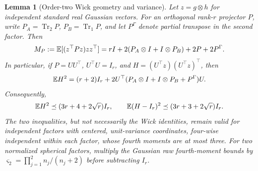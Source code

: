 \documentclass[11pt,a4paper]{article}
\newtheorem{lemma}[theorem]{Lemma}
\theoremstyle{definition}\newtheorem{definition}[theorem]{Definition}
\theoremstyle{remark}\newtheorem{remark}[theorem]{Remark}
\numberwithin{equation}{section}
\begin{document}
\begin{lemma}[Order-two Wick geometry and variance]
\label{core:lem:order-two-wick}
Let $z=g\otimes h$ for independent standard real Gaussian vectors.
For an orthogonal rank-$r$ projector $P$, write
$P_A=\operatorname{Tr}_2P$, $P_B=\operatorname{Tr}_1P$, and let
$P^\Gamma$ denote partial transpose in the second factor. Then
\begin{equation}\label{core:eq:wick-ambient}
 M_P:=\mathbb E[(z^\top Pz)zz^\top]
 =rI+2(P_A\otimes I+I\otimes P_B)+2P+2P^\Gamma.
\end{equation}
In particular, if $P=UU^\top$, $U^\top U=I_r$, and
$H=(U^\top z)(U^\top z)^\top$, then
\begin{equation}\label{core:eq:wick-exact}
 \mathbb E H^2=(r+2)I_r+
       2U^\top(P_A\otimes I+I\otimes P_B+P^\Gamma)U.
\end{equation}
Consequently,
\begin{equation}\label{core:eq:wick-variance}
 \mathbb E H^2\preceq(3r+4+2\sqrt r)I_r,\qquad
 \mathbb E(H-I_r)^2\preceq(3r+3+2\sqrt r)I_r.
\end{equation}
The two inequalities, but not necessarily the Wick identities, remain
valid for independent factors with centered, unit-variance coordinates,
four-wise independent within each factor, whose fourth moments are at
most three. For two normalized spherical factors, multiply the
Gaussian raw fourth-moment bounds by
$\varsigma_2=\prod_{j=1}^2 n_j/(n_j+2)$ before subtracting $I_r$.
\end{lemma}
\end{document}
